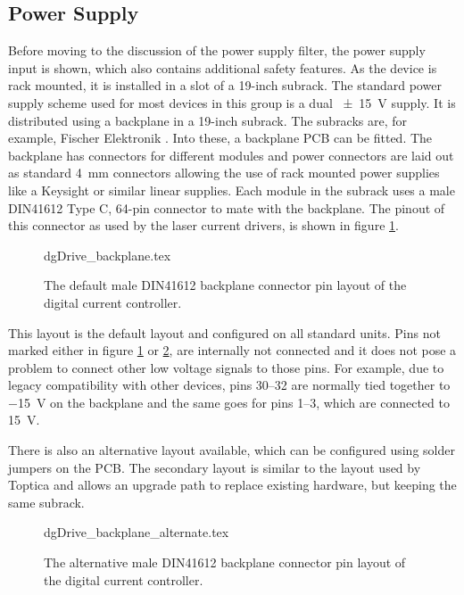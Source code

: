 \subsection{Power Supply}
Before moving to the discussion of the power supply filter, the power supply input is shown, which also contains additional safety features. As the device is rack mounted, it is installed in a slot of a 19-inch subrack. The standard power supply scheme used for most devices in this group is a dual \qty{\pm 15}{\V} supply. It is distributed using a  backplane in a 19-inch subrack. The subracks are, for example, Fischer Elektronik . Into these, a backplane PCB \cite{git_backplane} can be fitted. The backplane has connectors for different modules and power connectors are laid out as standard \qty{4}{\mm} connectors allowing the use of rack mounted power supplies like a Keysight  or similar linear supplies. Each module in the subrack uses a male DIN41612 Type C, 64-pin connector to mate with the backplane. The pinout of this connector as used by the laser current drivers, is shown in figure \ref{fig:laser_driver_connector}.
\begin{figure}[ht]
    \centering
        {dgDrive_backplane.tex}
    \caption{The default male DIN41612 backplane connector pin layout of the digital current controller.}
    \label{fig:laser_driver_connector}
\end{figure}

This layout is the default layout and configured on all standard units. Pins not marked either in figure \ref{fig:laser_driver_connector} or \ref{fig:laser_driver_connector_alternative}, are internally not connected and it does not pose a problem to connect other low voltage signals to those pins. For example, due to legacy compatibility with other devices, pins \numrange{30}{32} are normally tied together to \qty{-15}{\V} on the backplane and the same goes for pins \numrange{1}{3}, which are connected to \qty{15}{\V}.

There is also an alternative layout available, which can be configured using solder jumpers on the PCB. The secondary layout is similar to the layout used by Toptica and allows an upgrade path to replace existing hardware, but keeping the same subrack.
\begin{figure}[ht]
    \centering
        {dgDrive_backplane_alternate.tex}
    \caption{The alternative male DIN41612 backplane connector pin layout of the digital current controller.}
    \label{fig:laser_driver_connector_alternative}
\end{figure}

